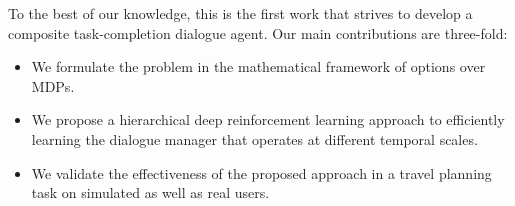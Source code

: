 \documentclass[11pt,letterpaper]{article}
\begin{document}
To the best of our knowledge, this is the first work that strives to develop a composite task-completion dialogue agent. Our main contributions are three-fold:

\begin{itemize}
\item We formulate the problem in the mathematical framework of options over MDPs.
\item We propose a hierarchical deep reinforcement learning approach to efficiently learning the dialogue manager that operates at different temporal scales. 
\item We validate the effectiveness of the proposed approach in a travel planning task on simulated as well as real users. 
\end{itemize}

	
	
\end{document}
